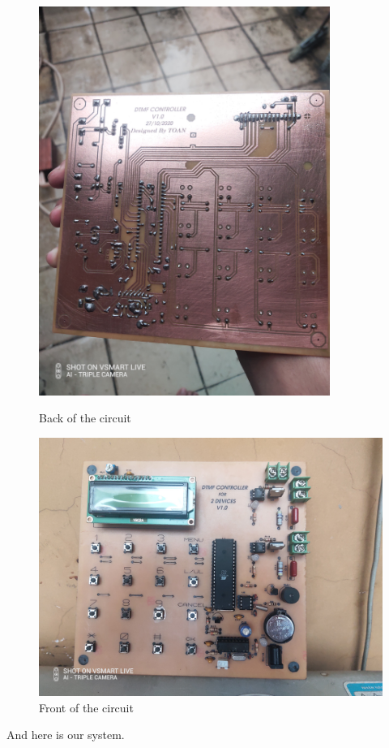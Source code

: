 \documentclass[a4paper]{article}
\begin{document}
\begin{figure}[h!]
\centering
\includegraphics[width=9.5cm]{images/backk.jpg}
\caption*{Back of the circuit}
\includegraphics[width=13cm]{images/frontt.jpg}
\caption*{Front of the circuit}
\end{figure}
\newpage
\noindent
And here is our system.
\end{document}
